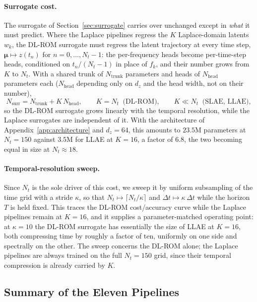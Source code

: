 ﻿\documentclass[a4paper,12pt]{article}
\theoremstyle{definition}
\theoremstyle{remark}
\newcommand{\vmu}{\bm{\mu}}
\begin{document}
\paragraph{Surrogate cost.}
The surrogate of Section~\ref{sec:surrogate} carries over unchanged except in \emph{what} it must predict. Where the Laplace pipelines regress the $K$ Laplace-domain latents $w_k$, the DL-ROM surrogate must regress the latent trajectory at every time step, $\vmu \mapsto z(t_n)$ for $n = 0, \dots, N_t-1$: the per-frequency heads become per-time-step heads, conditioned on $t_n/(N_t-1)$ in place of $f_k$, and their number grows from $K$ to $N_t$. With a shared trunk of $N_{\mathrm{trunk}}$ parameters and heads of $N_{\mathrm{head}}$ parameters each ($N_{\mathrm{head}}$ depending only on $d_z$ and the head width, not on their number),
\begin{equation}
    N_{\mathrm{surr}} = N_{\mathrm{trunk}} + K\,N_{\mathrm{head}}, \qquad K = N_t \;\;\text{(DL-ROM)}, \qquad K \ll N_t \;\;\text{(SLAE, LLAE)},
    \label{eq:surr_cost}
\end{equation}
so the DL-ROM surrogate grows linearly with the temporal resolution, while the Laplace surrogates are independent of it. With the architecture of Appendix~\ref{app:architecture} and $d_z = 64$, this amounts to $23.5$M parameters at $N_t = 150$ against $3.5$M for LLAE at $K = 16$, a factor of $6.8$, the two becoming equal in size at $N_t \approx 18$.

\paragraph{Temporal-resolution sweep.}
Since $N_t$ is the sole driver of this cost, we sweep it by uniform subsampling of the time grid with a stride $\kappa$, so that $N_t \mapsto \lceil N_t/\kappa \rceil$ and $\Delta t \mapsto \kappa\,\Delta t$ while the horizon $T$ is held fixed. This traces the DL-ROM cost/accuracy curve while the Laplace pipelines remain at $K = 16$, and it supplies a parameter-matched operating point: at $\kappa = 10$ the DL-ROM surrogate has essentially the size of LLAE at $K = 16$, both compressing time by roughly a factor of ten, uniformly on one side and spectrally on the other. The sweep concerns the DL-ROM alone; the Laplace pipelines are always trained on the full $N_t = 150$ grid, since their temporal compression is already carried by $K$.

\subsection{Summary of the Eleven Pipelines}
\label{sec:arch_summary}
\end{document}
